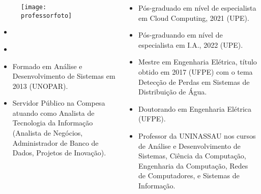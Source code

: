\begin{frame}[t]

    \begin{columns}[onlytextwidth,T]

        \begin{column}{0.5\linewidth}
            \small
            \begin{figure}[htb]
                \centering{}
                \texttt{[image: \\professorfoto]}

                \textbf{\href{\professorlattes}{\professor}}
            \end{figure}
            \begin{itemize}\small
                \justifying{}
                \item \href{\professorsite}{\professorsite}
                \item \href{\professorlattes}{\professorlattes}
                \item Formado em Análise e Desenvolvimento de Sistemas em 2013 (UNOPAR).
                \item Servidor Público na Compesa atuando como Analista de Tecnologia da Informação (Analista de Negócios, Administrador de Banco de Dados, Projetos de Inovação).
            \end{itemize}
        \end{column}

        \begin{column}{0.5\linewidth}
            \small
            \begin{itemize}\small
                \justifying{}
                \item Pós-graduado em nível de especialista em Cloud Computing, 2021 (UPE).
                \item Pós-graduando em nível de especialista em I.A., 2022 (UPE).
                \item Mestre em Engenharia Elétrica, título obtido em 2017 (UFPE) com o tema Detecção de Perdas em Sistemas de Distribuição de Água.
                \item Doutorando em Engenharia Elétrica (UFPE).
                \item Professor da UNINASSAU nos cursos de Análise e Desenvolvimento de Sistemas, Ciência da Computação, Engenharia da Computação, Redes de Computadores, e Sistemas de Informação.
            \end{itemize}
        \end{column}

    \end{columns}

\end{frame}

